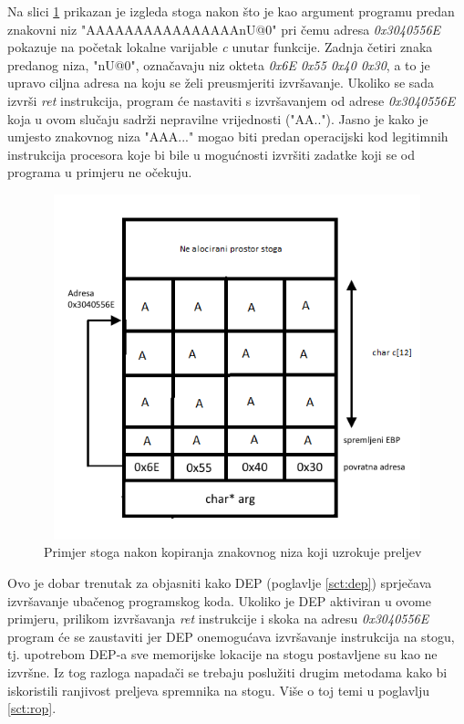 \documentclass[times, utf8, diplomski, numeric]{fer}
\begin{document}
Na slici \ref{fig:buff_overflow_overflow} prikazan je izgleda
stoga nakon što je kao argument programu predan znakovni niz
"AAAAAAAAAAAAAAAAnU@0" pri čemu adresa \emph{0x3040556E}				%
pokazuje na početak lokalne varijable \emph{c} unutar funkcije. 
Zadnja četiri znaka predanog niza, "nU@0", označavaju niz okteta
\emph{0x6E 0x55 0x40 0x30}, a to je upravo ciljna adresa na koju se 
želi preusmjeriti izvršavanje.
Ukoliko se sada izvrši \emph{ret} instrukcija, program će
nastaviti s izvršavanjem od adrese \emph{0x3040556E} koja u ovom
slučaju sadrži nepravilne vrijednosti ("AA.."). Jasno je kako je
umjesto znakovnog niza "AAA..." mogao biti predan operacijski kod
legitimnih instrukcija procesora koje bi bile u mogućnosti
izvršiti zadatke koji se od programa u primjeru ne očekuju.

\begin{figure}[!ht]
\centering
\setlength\fboxsep{0pt}
\setlength\fboxrule{0.5pt}
\includegraphics[width=12cm, height=10cm]{slike/buffer_overflow_overflow}
\caption{Primjer stoga nakon kopiranja znakovnog niza koji uzrokuje preljev}
\label{fig:buff_overflow_overflow} 
\end{figure}

Ovo je dobar trenutak za objasniti kako DEP (poglavlje \ref{sct:dep}) 
sprječava izvršavanje ubačenog programskog koda. Ukoliko je DEP				%
aktiviran u ovome primjeru, prilikom izvršavanja \emph{ret}
instrukcije i skoka na adresu \emph{0x3040556E} program će se
zaustaviti jer DEP onemogućava izvršavanje instrukcija na stogu,
tj. upotrebom DEP-a sve memorijske lokacije na stogu postavljene
su kao ne izvršne. Iz tog razloga napadači se trebaju poslužiti
drugim metodama kako bi iskoristili ranjivost preljeva spremnika
na stogu. Više o toj temi u poglavlju \ref{sct:rop}.
\end{document}
